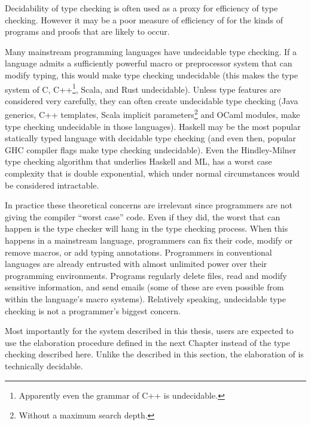 Decidability of type checking is often used as a proxy for efficiency of type checking.
However it may be a poor measure of efficiency of for the kinds of programs and proofs that are likely to occur.
 
 
Many mainstream programming languages have undecidable type checking.
If a language admits a sufficiently powerful macro or preprocessor system that can modify typing, this would make type checking undecidable (this makes the type system of C, C++\footnote{
  Apparently even the grammar of C++ is undecidable.
}, Scala, and Rust undecidable).
Unless type features are considered very carefully, they can often create undecidable type checking (Java generics, C++ templates, Scala implicit parameters\footnote{
  Without a maximum search depth.
} and OCaml modules, make type checking undecidable in those languages).
Haskell may be the most popular statically typed language with decidable type checking (and even then, popular GHC compiler flags make type checking undecidable).
Even the Hindley-Milner type checking algorithm that underlies Haskell and ML, has a worst case complexity that is double exponential, which under normal circumstances would be considered intractable.
 
In practice these theoretical concerns are irrelevant since programmers are not giving the compiler ``worst case'' code.
Even if they did, the worst that can happen is the type checker will hang in the type checking process.
When this happens in a mainstream language, programmers can fix their code, modify or remove macros, or add typing annotations.
Programmers in conventional languages are already entrusted with almost unlimited power over their programming environments.
Programs regularly delete files, read and modify sensitive information, and send emails (some of these are even possible from within the language's macro systems).
Relatively speaking, undecidable type checking is not a programmer's biggest concern.
 
Most importantly for the system described in this thesis, users are expected to use the elaboration procedure defined in the next Chapter instead of the \bidir{} type checking described here.
Unlike the \bidir{} described in this section, the elaboration of  is technically decidable.

